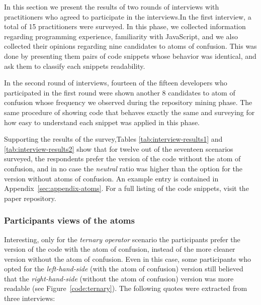 In this section we present the results of two rounds of interviews with practitioners who agreed to participate in the interviews.In the first interview, a total of 15 practitioners were surveyed. In this phase, we collected information regarding programming experience, familiarity with JavaScript, and we also collected their opinions regarding nine candidates to atoms of confusion. This was done by presenting them pairs of code snippets whose behavior was identical, and ask them to classify each snippets readability.

In the second round of interviews, fourteen of the fifteen developers who participated in the first round were shown another 8 candidates to atom of confusion whose frequency we observed during the repository mining phase. The same procedure of showing code that behaves exactly the same and surveying for how easy to understand each snippet was applied in this phase. 

Supporting the results of the survey,Tables \ref{tab:interview-results1} and \ref{tab:interview-results2} show that for twelve out of the seventeen scenarios surveyed, the respondents prefer the version of the code without the atom of confusion, and in no case the \emph{neutral} ratio was higher than the option for the version without atoms of confusion. An example entry is contained in Appendix~\ref{sec:appendix-atoms}. 
For a full listing of the code snippets, visit the paper repository. 

\subsubsection*{Participants views of the atoms} Interesting, only for the \emph{ternary operator} scenario the participants prefer the version of the code with the atom of confusion, instead of the more cleaner version without the atom of confusion. Even in this case, some participants who opted for the \emph{left-hand-side} (with the atom of confusion) version still believed that the \emph{right-hand-side} (without the atom of confusion) version was more readable (see Figure~\ref{code:ternary}). 
The following quotes were extracted from three interviews:

